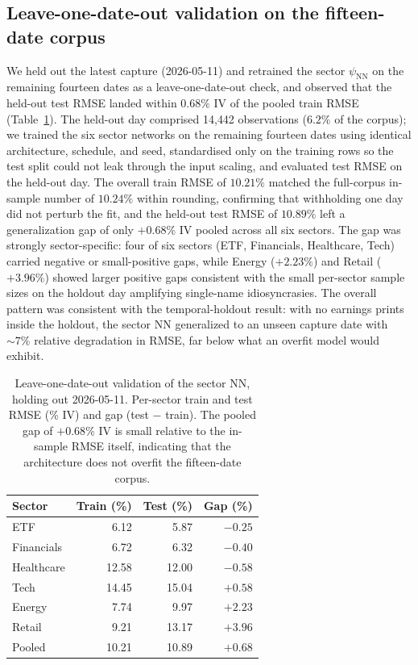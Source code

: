 \subsection{Leave-one-date-out validation on the fifteen-date corpus}\label{sec:supp_loo}

We held out the latest capture (2026-05-11) and retrained the sector $\psi_{\text{NN}}$ on the remaining fourteen dates as a leave-one-date-out check, and observed that the held-out test RMSE landed within $0.68\%$ IV of the pooled train RMSE (Table~\ref{tab:loo_sector_nn}). The held-out day comprised 14{,}442 observations ($6.2\%$ of the corpus); we trained the six sector networks on the remaining fourteen dates using identical architecture, schedule, and seed, standardised only on the training rows so the test split could not leak through the input scaling, and evaluated test RMSE on the held-out day. The overall train RMSE of $10.21\%$ matched the full-corpus in-sample number of $10.24\%$ within rounding, confirming that withholding one day did not perturb the fit, and the held-out test RMSE of $10.89\%$ left a generalization gap of only $+0.68\%$ IV pooled across all six sectors. The gap was strongly sector-specific: four of six sectors (ETF, Financials, Healthcare, Tech) carried negative or small-positive gaps, while Energy ($+2.23\%$) and Retail ($+3.96\%$) showed larger positive gaps consistent with the small per-sector sample sizes on the holdout day amplifying single-name idiosyncrasies. The overall pattern was consistent with the temporal-holdout result: with no earnings prints inside the holdout, the sector NN generalized to an unseen capture date with $\sim 7\%$ relative degradation in RMSE, far below what an overfit model would exhibit.

\begin{table}[ht]
\centering
\caption{Leave-one-date-out validation of the sector NN, holding out 2026-05-11. Per-sector train and test RMSE (\% IV) and gap (test $-$ train). The pooled gap of $+0.68\%$ IV is small relative to the in-sample RMSE itself, indicating that the architecture does not overfit the fifteen-date corpus.}\label{tab:loo_sector_nn}
\begin{tabular}{lrrr}
\toprule
Sector & Train (\%) & Test (\%) & Gap (\%) \\
\midrule
ETF        &  6.12 &  5.87 & $-0.25$ \\
Financials &  6.72 &  6.32 & $-0.40$ \\
Healthcare & 12.58 & 12.00 & $-0.58$ \\
Tech       & 14.45 & 15.04 & $+0.58$ \\
Energy     &  7.74 &  9.97 & $+2.23$ \\
Retail     &  9.21 & 13.17 & $+3.96$ \\
\midrule
Pooled     & 10.21 & 10.89 & $+0.68$ \\
\bottomrule
\end{tabular}
\end{table}

